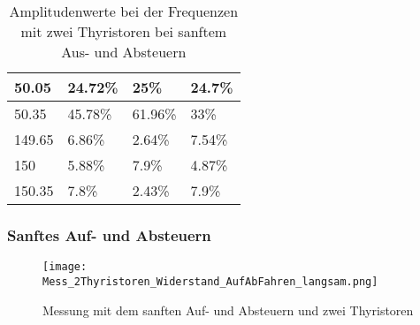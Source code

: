 \begin{table}[ht!]
\begin{tabular}{|l|l|l|l|}
		50.05             & 24.72\%                                                                             & 25\%                                                                                & 24.7\%                                                                              \\ \hline
		50.35             & 45.78\%                                                                             & 61.96\%                                                                             & 33\%                                                                                \\ \hline
		149.65            & 6.86\%                                                                              & 2.64\%                                                                              & 7.54\%                                                                              \\ \hline
		150               & 5.88\%                                                                              & 7.9\%                                                                               & 4.87\%                                                                              \\ \hline
		150.35            & 7.8\%                                                                               & 2.43\%                                                                              & 7.9\%                                                                               \\ \hline
	\end{tabular}
\caption{Amplitudenwerte bei der Frequenzen mit zwei Thyristoren bei sanftem Aus- und Absteuern}\label{tab:Mess_2Thyristoren_Spannung_ASM_AufAb_sanft}
\end{table}

\newpage
\subsubsection*{Sanftes Auf- und Absteuern}

\begin{figure}[ht!]
	\centering
	\texttt{[image: Mess\_2Thyristoren\_Widerstand\_AufAbFahren\_langsam.png]}	
	\caption{Messung mit dem sanften Auf- und Absteuern und zwei Thyristoren}\label{Mess_2Thyristoren_Widerstand_AufAbFahren_langsam}	
\end{figure}

